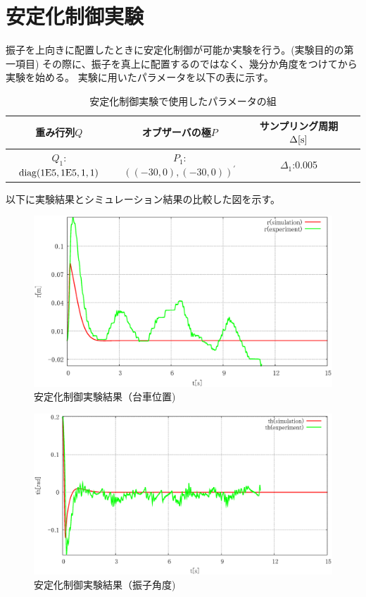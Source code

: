 \section{安定化制御実験}
	振子を上向きに配置したときに安定化制御が可能か実験を行う。(実験目的の第一項目)
	その際に、振子を真上に配置するのではなく、幾分か角度をつけてから実験を始める。
	実験に用いたパラメータを以下の表に示す。
	\begin{table}[H]
		\begin{center}
			\caption{安定化制御実験で使用したパラメータの組}
			\medskip
			
			\begin{tabular}{|c|c|c|c|}\hline
				重み行列$Q$ & オブザーバの極$P$ & サンプリング周期$\Delta[\rm{s}]$ \\ \hline\hline
				$Q_1$:$\rm{diag}(1E5,1E5,1,1)$ & $P_1$:$((-30,0),(-30,0))^{'}$ & $\Delta_1$:0.005 \\ \hline
			\end{tabular}
		\end{center}
		\label{table:huriage_control}
	\end{table}
	以下に実験結果とシミュレーション結果の比較した図を示す。
	\begin{figure}[H]
		\centering
		\includegraphics[width=0.8\linewidth]{gazo/experiment_control_R.eps}
		\caption{安定化制御実験結果（台車位置)}
		\label{image:experiment_control_R}
	\end{figure}
	\begin{figure}[H]
		\centering
		\includegraphics[width=0.8\linewidth]{gazo/experiment_control_TH.eps}
		\caption{安定化制御実験結果（振子角度)}
		\label{image:experiment_control_TH}
	\end{figure}
